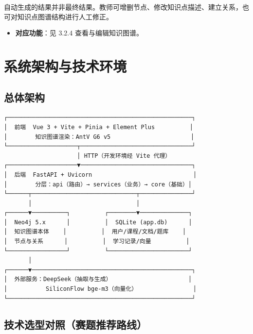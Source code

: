 \documentclass[UTF8,a4paper,11pt]{ctexrep}
\begin{document}
自动生成的结果并非最终结果。教师可增删节点、修改知识点描述、建立关系，也可对知识点图谱结构进行人工修正。

\begin{itemize}
\item \textbf{对应功能}：见 3.2.4 查看与编辑知识图谱。
\end{itemize}

\section{系统架构与技术环境}


\subsection{总体架构}

\begin{Verbatim}[fontsize=\small,frame=single,framesep=4pt,rulecolor=\color{codeframe}]
┌─────────────────────────────────────────────────────┐
│  前端  Vue 3 + Vite + Pinia + Element Plus          │
│        知识图谱渲染：AntV G6 v5                       │
└────────────────────┬────────────────────────────────┘
                     │ HTTP（开发环境经 Vite 代理）
┌────────────────────▼────────────────────────────────┐
│  后端  FastAPI + Uvicorn                             │
│        分层：api（路由）→ services（业务）→ core（基础）│
└──────┬──────────────────────────────┬───────────────┘
       │                              │
┌──────▼──────────┐          ┌────────▼──────────────┐
│  Neo4j 5.x      │          │  SQLite (app.db)      │
│  知识图谱本体    │          │  用户/课程/文档/题库    │
│  节点与关系      │          │  学习记录/向量          │
└─────────────────┘          └───────────────────────┘
       │
┌──────▼──────────────────────────────────────────────┐
│  外部服务：DeepSeek（抽取与生成）                      │
│           SiliconFlow bge-m3（向量化）                │
└─────────────────────────────────────────────────────┘
\end{Verbatim}


\subsection{技术选型对照（赛题推荐路线）}
\end{document}
